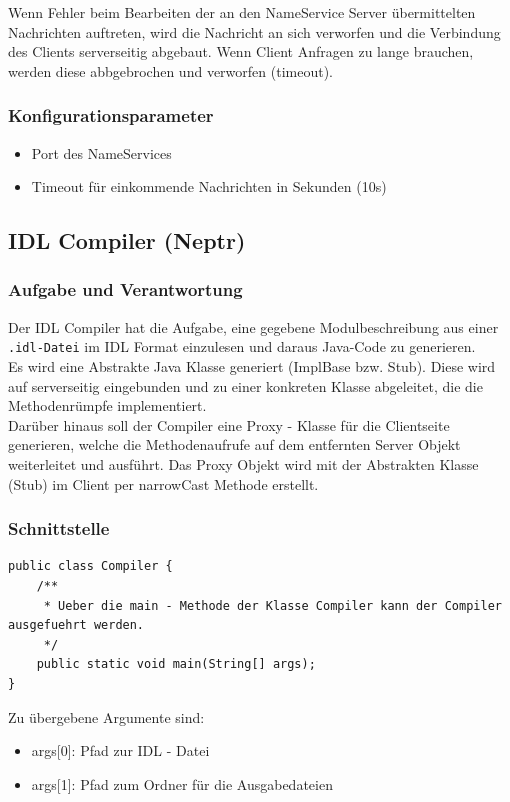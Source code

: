 \documentclass{article}
\begin{document}
Wenn Fehler beim Bearbeiten der an den NameService Server übermittelten Nachrichten auftreten, wird die Nachricht an
sich verworfen und die Verbindung des Clients serverseitig abgebaut. Wenn Client Anfragen zu lange brauchen, werden
diese abbgebrochen und verworfen (timeout).

\subsubsection{Konfigurationsparameter}
\begin{itemize}
    \item Port des NameServices
    \item Timeout für einkommende Nachrichten in Sekunden (10s)
\end{itemize}

\subsection{IDL Compiler (Neptr)}
\subsubsection{Aufgabe und Verantwortung}
Der IDL Compiler hat die Aufgabe, eine gegebene Modulbeschreibung aus einer \texttt{.idl-Datei} im IDL Format einzulesen
und daraus Java-Code zu generieren.\\

Es wird eine Abstrakte Java Klasse generiert (ImplBase bzw. Stub). Diese wird auf serverseitig eingebunden und zu einer
konkreten Klasse abgeleitet, die die Methodenrümpfe implementiert.\\

Darüber hinaus soll der Compiler eine Proxy - Klasse für die Clientseite generieren, welche die Methodenaufrufe auf dem
entfernten Server Objekt weiterleitet und ausführt. Das Proxy Objekt wird mit der Abstrakten Klasse (Stub) im Client
per narrowCast Methode erstellt.

\subsubsection{Schnittstelle}
\begin{lstlisting}
public class Compiler {
    /**
     * Ueber die main - Methode der Klasse Compiler kann der Compiler ausgefuehrt werden.
     */
    public static void main(String[] args);
}
\end{lstlisting}
Zu übergebene Argumente sind:
\begin{itemize}
	\item args[0]: Pfad zur IDL - Datei
	\item args[1]: Pfad zum Ordner für die Ausgabedateien
\end{itemize}
\end{document}
